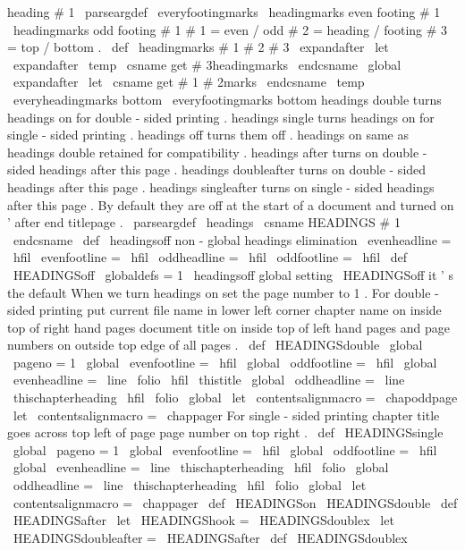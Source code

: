 {{{{{{
heading
}
{
#
1
}
}
\
parseargdef
\
everyfootingmarks
{
\
headingmarks
{
even
}
{
footing
}
{
#
1
}
\
headingmarks
{
odd
}
{
footing
}
{
#
1
}
}
%
#
1
=
even
/
odd
#
2
=
heading
/
footing
#
3
=
top
/
bottom
.
\
def
\
headingmarks
#
1
#
2
#
3
{
%
\
expandafter
\
let
\
expandafter
\
temp
\
csname
get
#
3headingmarks
\
endcsname
\
global
\
expandafter
\
let
\
csname
get
#
1
#
2marks
\
endcsname
\
temp
}
\
everyheadingmarks
bottom
\
everyfootingmarks
bottom
%
headings
double
turns
headings
on
for
double
-
sided
printing
.
%
headings
single
turns
headings
on
for
single
-
sided
printing
.
%
headings
off
turns
them
off
.
%
headings
on
same
as
headings
double
retained
for
compatibility
.
%
headings
after
turns
on
double
-
sided
headings
after
this
page
.
%
headings
doubleafter
turns
on
double
-
sided
headings
after
this
page
.
%
headings
singleafter
turns
on
single
-
sided
headings
after
this
page
.
%
By
default
they
are
off
at
the
start
of
a
document
%
and
turned
on
'
after
end
titlepage
.
\
parseargdef
\
headings
{
\
csname
HEADINGS
#
1
\
endcsname
}
\
def
\
headingsoff
{
%
non
-
global
headings
elimination
\
evenheadline
=
{
\
hfil
}
\
evenfootline
=
{
\
hfil
}
%
\
oddheadline
=
{
\
hfil
}
\
oddfootline
=
{
\
hfil
}
%
}
\
def
\
HEADINGSoff
{
{
\
globaldefs
=
1
\
headingsoff
}
}
%
global
setting
\
HEADINGSoff
%
it
'
s
the
default
%
When
we
turn
headings
on
set
the
page
number
to
1
.
%
For
double
-
sided
printing
put
current
file
name
in
lower
left
corner
%
chapter
name
on
inside
top
of
right
hand
pages
document
%
title
on
inside
top
of
left
hand
pages
and
page
numbers
on
outside
top
%
edge
of
all
pages
.
\
def
\
HEADINGSdouble
{
%
\
global
\
pageno
=
1
\
global
\
evenfootline
=
{
\
hfil
}
\
global
\
oddfootline
=
{
\
hfil
}
\
global
\
evenheadline
=
{
\
line
{
\
folio
\
hfil
\
thistitle
}
}
\
global
\
oddheadline
=
{
\
line
{
\
thischapterheading
\
hfil
\
folio
}
}
\
global
\
let
\
contentsalignmacro
=
\
chapoddpage
}
\
let
\
contentsalignmacro
=
\
chappager
%
For
single
-
sided
printing
chapter
title
goes
across
top
left
of
page
%
page
number
on
top
right
.
\
def
\
HEADINGSsingle
{
%
\
global
\
pageno
=
1
\
global
\
evenfootline
=
{
\
hfil
}
\
global
\
oddfootline
=
{
\
hfil
}
\
global
\
evenheadline
=
{
\
line
{
\
thischapterheading
\
hfil
\
folio
}
}
\
global
\
oddheadline
=
{
\
line
{
\
thischapterheading
\
hfil
\
folio
}
}
\
global
\
let
\
contentsalignmacro
=
\
chappager
}
\
def
\
HEADINGSon
{
\
HEADINGSdouble
}
\
def
\
HEADINGSafter
{
\
let
\
HEADINGShook
=
\
HEADINGSdoublex
}
\
let
\
HEADINGSdoubleafter
=
\
HEADINGSafter
\
def
\
HEADINGSdoublex
{
%
\
}}}}}
